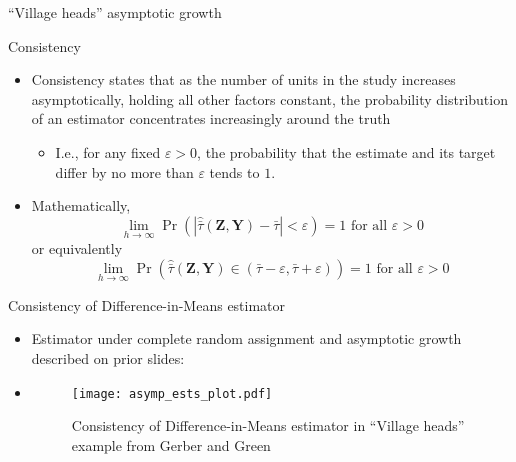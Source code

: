 \documentclass[table, xcolor={dvipsnames}, 9pt]{beamer}
\theoremstyle{newstyle}
\begin{document}
\begin{frame}{``Village heads'' asymptotic growth}
\end{frame}
\begin{frame}{Consistency}
\begin{itemize}
\item Consistency states that as the number of units in the study increases asymptotically, holding all other factors constant, the probability distribution of an estimator concentrates increasingly around the truth
\begin{itemize}
\item I.e., for any fixed $\varepsilon > 0$, the probability that the estimate and its target differ by no more than $\varepsilon$ tends to $1$.
\end{itemize}
\item Mathematically, 
\begin{equation}
\lim_{h \to \infty} \Pr\left(\left\lvert \hat{\bar{\tau}}\left(\mathbf{Z}, \mathbf{Y}\right) - \bar{\tau} \right\rvert < \varepsilon \right) = 1 \text{ for all } \varepsilon > 0
\end{equation}
or equivalently
\begin{equation}
\lim_{h \to \infty} \Pr\left(\hat{\bar{\tau}}\left(\mathbf{Z}, \mathbf{Y}\right) \in \left(\bar{\tau} - \varepsilon, \bar{\tau} + \varepsilon\right)\right) = 1 \text{ for all } \varepsilon > 0
\end{equation}
\end{itemize}
\end{frame}
\begin{frame}{Consistency of Difference-in-Means estimator}
\begin{itemize}
\item Estimator under complete random assignment and asymptotic growth described on prior slides:
\item[] 
\begin{figure}[H]
\texttt{[image: asymp\_ests\_plot.pdf]}
\caption{Consistency of Difference-in-Means estimator in ``Village heads'' example from Gerber and Green}
\end{figure}
\end{itemize}
\end{frame}
\end{document}
